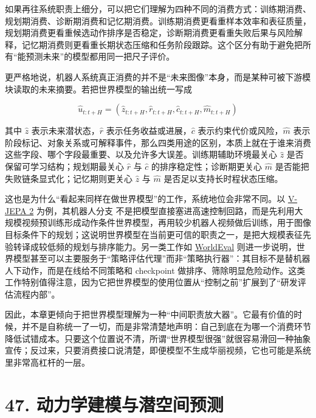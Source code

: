 如果再往系统职责上细分，可以把它们理解为四种不同的消费方式：训练期消费、规划期消费、诊断期消费和记忆期消费。训练期消费更看重样本效率和表征质量，规划期消费更看重候选动作排序是否稳定，诊断期消费更看重失败后果与风险解释，记忆期消费则更看重长期状态压缩和任务阶段跟踪。这个区分有助于避免把所有“能预测未来”的模型都用同一把尺子评价。

更严格地说，机器人系统真正消费的并不是“未来图像”本身，而是某种可被下游模块读取的未来摘要。若把世界模型的输出统一写成

\begingroup
\scriptsize
\begin{equation*}
\hat{u}_{t:t+H} =
\left(
\hat{z}_{t:t+H},
\hat{r}_{t:t+H},
\hat{c}_{t:t+H},
\hat{m}_{t:t+H}
\right)
\end{equation*}
\endgroup

其中 \(\hat{z}\) 表示未来潜状态，\(\hat{r}\) 表示任务收益或进展，\(\hat{c}\) 表示约束代价或风险，\(\hat{m}\) 表示阶段标记、对象关系或可解释事件，那么四类用途的区别，本质上就在于谁来消费这些字段、哪个字段最重要、以及允许多大误差。训练期辅助环境最关心 \(\hat{z}\) 是否保留可学习结构；规划期最关心 \(\hat{r}\) 与 \(\hat{c}\) 的排序稳定性；诊断期更关心 \(\hat{m}\) 是否能把失败链条显式化；记忆期则更关心 \(\hat{z}\) 与 \(\hat{m}\) 是否足以支持长时程状态压缩。

这也是为什么“看起来同样在做世界模型”的工作，系统地位会非常不同。以 \href{https://arxiv.org/abs/2506.09985}{V-JEPA 2} 为例，其机器人分支 \texttt{} 不是把模型直接塞进高速控制回路，而是先利用大规模视频预训练形成动作条件世界模型，再用较少机器人视频做后训练，用于图像目标条件下的规划；这说明世界模型在当前更可信的职责之一，是把大规模表征先验转译成较低频的规划与排序能力。另一类工作如 \href{https://arxiv.org/abs/2505.19017}{WorldEval} 则进一步说明，世界模型甚至可以主要服务于“策略评估代理”而非“策略执行器”：其目标不是替机器人下动作，而是在线给不同策略和 checkpoint 做排序、筛除明显危险动作。这类工作特别值得注意，因为它把世界模型的使用位置从“控制之前”扩展到了“研发评估流程内部”。

因此，本章更倾向于把世界模型理解为一种“中间职责放大器”。它最有价值的时候，并不是自称统一了一切，而是非常清楚地声明：自己到底在为哪一个消费环节降低试错成本。只要这个位置说不清，所谓“世界模型很强”就很容易滑回一种抽象宣传；反过来，只要消费接口说清楚，即便模型不生成华丽视频，它也可能是系统里非常高杠杆的一层。

\chapter*{47. 动力学建模与潜空间预测}

